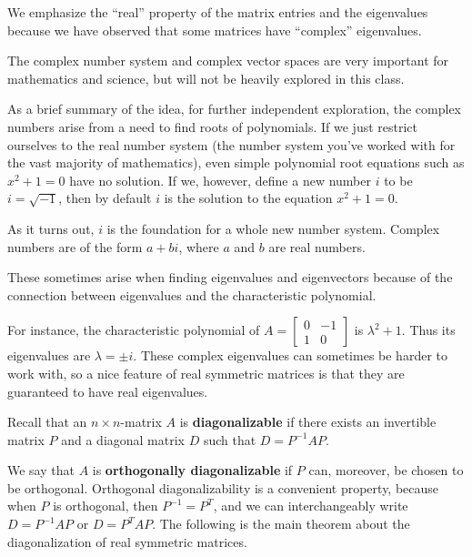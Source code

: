 \documentclass{ximera}
\begin{document}
\begin{remark}
  We emphasize the ``real'' property of the matrix entries and the eigenvalues because we have observed that some matrices have ``complex'' eigenvalues. 
  
  The complex number system and complex vector spaces are very important for mathematics and science, but will not be heavily explored in this class. 

  As a brief summary of the idea, for further independent exploration, the complex numbers arise from a need to find roots of polynomials. If we just restrict ourselves to the real number system (the number system you've worked with for the vast majority of mathematics), even simple polynomial root equations such as $x^2+1=0$ have no solution. If we, however, define a new number $i$ to be $i=\sqrt{-1}$, then by default $i$ is the solution to the equation $x^2+1=0$.

  As it turns out, $i$ is the foundation for a whole new number system. Complex numbers are of the form $a+bi$, where $a$ and $b$ are real numbers. 

  These sometimes arise when finding eigenvalues and eigenvectors because of the connection between eigenvalues and the characteristic polynomial. 

  For instance, the characteristic polynomial of $A=\begin{bmatrix}
    0 & -1 \\ 1 & 0
  \end{bmatrix}$ is $\lambda^2+1$. Thus its eigenvalues are $\lambda=\pm i$. These complex eigenvalues can sometimes be harder to work with, so a nice feature of real symmetric matrices is that they are guaranteed to have real eigenvalues.
\end{remark}

\begin{definition}\label{def:orthogonal-diagonalizable}

  Recall that an $n\times n$-matrix $A$ is \textbf{diagonalizable} if there exists an invertible matrix $P$
  and a diagonal matrix $D$ such that $D = P^{-1}AP$. 

  We say that $A$ is \textbf{orthogonally diagonalizable} if $P$ can, moreover, be
chosen to be orthogonal. Orthogonal diagonalizability is a convenient
property, because when $P$ is orthogonal, then $P^{-1}=P^T$, and we
can interchangeably write $D = P^{-1}AP$ or $D = P^TAP$.  The
following is the main theorem about the diagonalization of real
symmetric matrices.
\end{definition}
\end{document}
